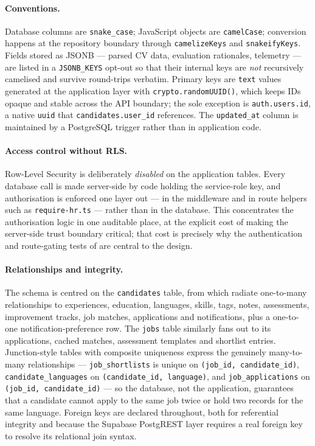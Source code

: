 \paragraph{Conventions.}
Database columns are \texttt{snake\_case}; JavaScript objects are
\texttt{camelCase}; conversion happens at the repository boundary through
\texttt{camelizeKeys} and \texttt{snakeifyKeys}. Fields stored as JSONB ---
parsed CV data, evaluation rationales, telemetry --- are listed in a
\texttt{JSONB\_KEYS} opt-out so that their internal keys are \emph{not}
recursively camelised and survive round-trips verbatim. Primary keys are
\texttt{text} values generated at the application layer with
\texttt{crypto.randomUUID()}, which keeps IDs opaque and stable across the
API boundary; the sole exception is \texttt{auth.users.id}, a native
\texttt{uuid} that \texttt{candidates.user\_id} references. The
\texttt{updated\_at} column is maintained by a PostgreSQL trigger rather than
in application code.

\paragraph{Access control without RLS.}
Row-Level Security is deliberately \emph{disabled} on the application tables.
Every database call is made server-side by code holding the service-role
key, and authorisation is enforced one layer out --- in the middleware and
in route helpers such as \texttt{require-hr.ts} --- rather than in the
database. This concentrates the authorisation logic in one auditable place,
at the explicit cost of making the server-side trust boundary critical;
that cost is precisely why the authentication and route-gating tests of
 are central to the design.

\paragraph{Relationships and integrity.}
The schema is centred on the \texttt{candidates} table, from which radiate
one-to-many relationships to experiences, education, languages, skills, tags,
notes, assessments, improvement tracks, job matches, applications and
notifications, plus a one-to-one notification-preference row. The
\texttt{jobs} table similarly fans out to its applications, cached matches,
assessment templates and shortlist entries. Junction-style tables with
composite uniqueness express the genuinely many-to-many relationships ---
\texttt{job\_shortlists} is unique on \texttt{(job\_id, candidate\_id)},
\texttt{candidate\_languages} on \texttt{(candidate\_id, language)}, and
\texttt{job\_applications} on \texttt{(job\_id, candidate\_id)} --- so the
database, not the application, guarantees that a candidate cannot apply to
the same job twice or hold two records for the same language. Foreign keys
are declared throughout, both for referential integrity and because the
Supabase PostgREST layer requires a real foreign key to resolve its
relational join syntax.

